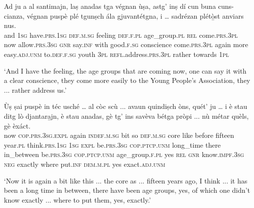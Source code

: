 \begin{linenumbers}
	\gll  Ad ju a al santimajn, laṣ anadas tga végnan ùṣa, astg’ inṣ dí cun buna cuns-cianza, végnan puspè plé tgunṣch ála gjuvantétgna, i … sadrézan plétò̱st anviars nus.\\
and \textsc{1sg} have.\textsc{prs.1sg} \textsc{def.m.sg} feeling \textsc{def.f.pl} age\_group.\textsc{pl} \textsc{rel} come.\textsc{prs.3pl} now allow.\textsc{prs.3sg} \textsc{gnr} say.\textsc{inf} with good.\textsc{f.sg} conscience come.\textsc{prs.3pl} again more easy.\textsc{adj.unm} to.\textsc{def.f.sg} youth \textsc{3pl} {} \textsc{refl}.address.\textsc{prs.3pl} rather towards \textsc{1pl}	\\
\end{linenumbers}
\medskip
\glt `And I have the feeling, the age groups that are coming now, one can say it with a clear conscience, they come more easily to the Young People's Association, they ... rather address us.'
\medskip

\begin{linenumbers}
	\gll Ùṣ ṣai puspè in téc usché … al còc scù ... avaun quindiṣch òns, quét’ ju … i è stau ditg lò djantara̱jn, è stau anadas, gè tg’ ins savèva bétga pròpi ... nù métar quèls, gè èxáct.\\
	now \textsc{cop.prs.3sg.expl} again \textsc{indef.m.sg} bit so {} \textsc{def.m.sg} core like {} before fifteen year.\textsc{pl} think.\textsc{prs.1sg} \textsc{1sg} {} \textsc{expl} be.\textsc{prs.3sg} \textsc{cop.ptcp.unm} long\_time there in\_between be.\textsc{prs.3sg} \textsc{cop.ptcp.unm} age\_group.\textsc{f.pl} yes \textsc{rel} \textsc{gnr} know.\textsc{impf.3sg} \textsc{neg} exactly {} where put.\textsc{inf} \textsc{dem.m.pl} yes exact.\textsc{adj.unm} \\
\end{linenumbers}
\medskip
\glt `Now it is again a bit like this ... the core as ... fifteen years ago, I think ... it has been a long time in between, there have been age groups, yes, of which one didn't know exactly ... where to put them, yes, exactly.'
\medskip

